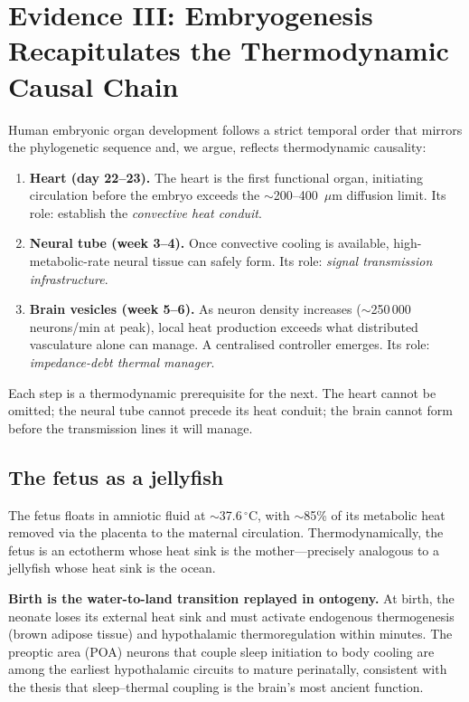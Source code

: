 ﻿\documentclass[aps,pre,twocolumn,superscriptaddress,floatfix]{revtex4-2}
\begin{document}
\section{Evidence III: Embryogenesis Recapitulates the
Thermodynamic Causal Chain}
\label{sec:embryo}

Human embryonic organ development follows a strict
temporal order that mirrors the phylogenetic sequence
and, we argue, reflects thermodynamic causality:

\begin{enumerate}
  \item \textbf{Heart (day 22--23).}
    The heart is the first functional organ,
    initiating circulation before the embryo exceeds
    the $\sim$200--400~$\mu$m diffusion limit.
    Its role: establish the \emph{convective heat conduit}.
  \item \textbf{Neural tube (week 3--4).}
    Once convective cooling is available,
    high-metabolic-rate neural tissue can safely form.
    Its role: \emph{signal transmission infrastructure}.
  \item \textbf{Brain vesicles (week 5--6).}
    As neuron density increases
    ($\sim$250\,000 neurons/min at peak),
    local heat production exceeds what distributed
    vasculature alone can manage.
    A centralised controller emerges.
    Its role: \emph{impedance-debt thermal manager}.
\end{enumerate}

Each step is a thermodynamic prerequisite for the next.
The heart cannot be omitted; the neural tube cannot
precede its heat conduit; the brain cannot form before
the transmission lines it will manage.

\subsection{The fetus as a jellyfish}
\label{sec:fetus}

The fetus floats in amniotic fluid at
$\sim$37.6$\,^{\circ}$C, with $\sim$85\%
of its metabolic heat removed via the placenta
to the maternal circulation.
Thermodynamically, the fetus is an ectotherm
whose heat sink is the mother---precisely analogous
to a jellyfish whose heat sink is the ocean.

\textbf{Birth is the water-to-land transition
replayed in ontogeny.}
At birth, the neonate loses its external heat sink
and must activate endogenous thermogenesis
(brown adipose tissue) and hypothalamic thermoregulation
within minutes.
The preoptic area (POA) neurons that couple
sleep initiation to body cooling are among the
earliest hypothalamic circuits to mature perinatally,
consistent with the thesis that sleep--thermal coupling
is the brain's most ancient function.
\end{document}
